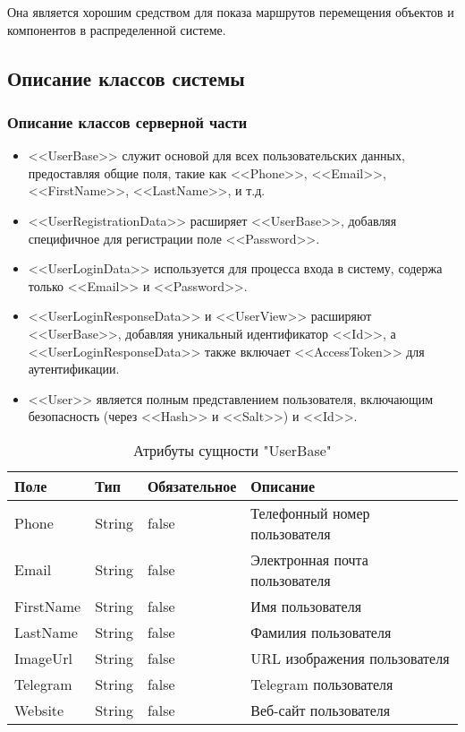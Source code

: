 Она является хорошим средством для показа маршрутов перемещения объектов и компонентов в распределенной системе.

\subsection{Описание классов системы}

\subsubsection{Описание классов серверной части}

\begin{itemize}
    \item <<UserBase>> служит основой для всех пользовательских данных, предоставляя общие поля, такие как <<Phone>>, <<Email>>, <<FirstName>>, <<LastName>>, и т.д.
    \item <<UserRegistrationData>> расширяет <<UserBase>>, добавляя специфичное для регистрации поле <<Password>>.
    \item <<UserLoginData>> используется для процесса входа в систему, содержа только <<Email>> и <<Password>>.
    \item <<UserLoginResponseData>> и <<UserView>> расширяют <<UserBase>>, добавляя уникальный идентификатор <<Id>>, а <<UserLoginResponseData>> также включает <<AccessToken>> для аутентификации.
    \item <<User>> является полным представлением пользователя, включающим безопасность (через <<Hash>> и <<Salt>>) и <<Id>>.
\end{itemize}

\begin{xltabular}{\textwidth}{|l|l|p{1.7cm}|X|}
    \caption{Атрибуты сущности "UserBase"}\\ \hline
    Поле & Тип & Обяза\-тельное & Описание \\ \hline
    Phone & String & false & Телефонный номер пользователя \\ \hline
    Email & String & false & Электронная почта пользователя \\ \hline
    FirstName & String & false & Имя пользователя \\ \hline
    LastName & String & false & Фамилия пользователя \\ \hline
    ImageUrl & String & false & URL изображения пользователя \\ \hline
    Telegram & String & false & Telegram пользователя \\ \hline
    Website & String & false & Веб-сайт пользователя \\ \hline
\end{xltabular}


